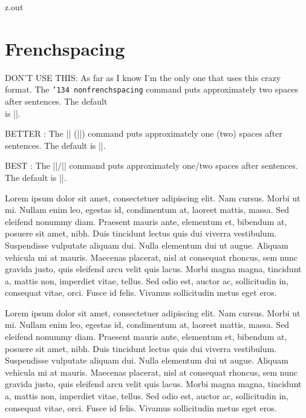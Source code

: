 \MyIO


\begin{VerbatimOut}{z.out}


\section{Frenchspacing}%
\index{\verb+\frenchspacing+}
\index{\verb+\nonfrenchspacing+}

{\small DON'T USE THIS:}
As far as I know I'm the only one
that uses this crazy format.
The
\def\t{{\tt\char'134 frenchspacing}}
\def\u{{\tt\char'134 nonfrenchspacing}}
\hbox{\rlap{\t}}%
\hbox{\u}
command puts approximately
\hbox{}%
\hbox{two}
spaces after sentences.
The default\\[2pt]
is |\nonfrenchspacing|.

{\small BETTER} \cite{kris2014}:
The
|\frenchspacing| (|\nonfrenchspacing|)
command puts approximately
one (two)
spaces after sentences.
The default is |\nonfrenchspacing|.

{\small BEST} \cite{cms17-slashes-to-signify-alternatives}:
The
|\frenchspacing|/|\nonfrenchspacing|
command puts approximately
one/two
spaces after sentences.
The default is |\nonfrenchspacing|.

{
  \frenchspacing
  Lorem ipsum dolor sit amet, consectetuer adipiscing elit. Nam
  cursus. Morbi ut mi. Nullam enim leo, egestas id, condimentum at,
  laoreet mattis, massa. Sed eleifend nonummy diam. Praesent mauris
  ante, elementum et, bibendum at, posuere sit amet, nibh. Duis
  tincidunt lectus quis dui viverra vestibulum. Suspendisse
  vulputate aliquam dui. Nulla elementum dui ut augue. Aliquam
  vehicula mi at mauris. Maecenas placerat, nisl at consequat
  rhoncus, sem nunc gravida justo, quis eleifend arcu velit quis
  lacus. Morbi magna magna, tincidunt a, mattis non, imperdiet
  vitae, tellus. Sed odio est, auctor ac, sollicitudin in,
  consequat vitae, orci. Fusce id felis. Vivamus sollicitudin metus
  eget eros.\endgraf
}

Lorem ipsum dolor sit amet, consectetuer adipiscing elit. Nam
cursus. Morbi ut mi. Nullam enim leo, egestas id, condimentum at,
laoreet mattis, massa. Sed eleifend nonummy diam. Praesent mauris
ante, elementum et, bibendum at, posuere sit amet, nibh. Duis
tincidunt lectus quis dui viverra vestibulum. Suspendisse
vulputate aliquam dui. Nulla elementum dui ut augue. Aliquam
vehicula mi at mauris. Maecenas placerat, nisl at consequat
rhoncus, sem nunc gravida justo, quis eleifend arcu velit quis
lacus. Morbi magna magna, tincidunt a, mattis non, imperdiet
vitae, tellus. Sed odio est, auctor ac, sollicitudin in,
consequat vitae, orci. Fusce id felis. Vivamus sollicitudin metus
eget eros.
\end{VerbatimOut}

